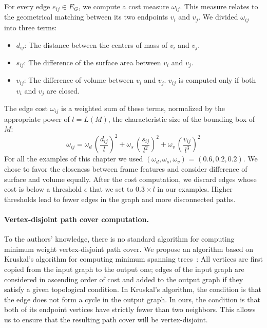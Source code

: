 For every edge $e_{ij}\in E_{G}$, we compute a cost measure \(\omega_{ij}\). This measure relates to the geometrical matching between its two endpoints $v_{i}$ and $v_{j}$.
We divided \(\omega_{ij}\) into three terms:
\begin{itemize}
    \item $d_{ij}$: The distance between the centers of mass of $v_{i}$ and $v_{j}$.
    \item $s_{ij}$: The difference of the surface area between $v_{i}$ and $v_{j}$.
    \item $v_{ij}$: The difference of volume between $v_{i}$ and $v_{j}$. $v_{ij}$ is computed only if both $v_{i}$ and $v_{j}$ are closed.
\end{itemize}
The edge cost $\omega_{ij}$ is a weighted sum of these terms, normalized by the appropriate power of $l=L(M)$, the characteristic size of the bounding box of $M$:
\begin{equation}
\label{eq:costfunction}
\displaystyle \omega_{ij} = 
\omega_{d}\, \left(\frac{d_{ij}}{l  }\right)^2 +
\omega_{s}\, \left(\frac{s_{ij}}{l^2}\right)^2 + 
\omega_{v}\, \left(\frac{v_{ij}}{l^3}\right)^2
\end{equation}
For all the examples of this chapter we used $\left( \omega_{d}, \omega_{s}, \omega_{v} \right)$ = $\left(0.6,0.2,0.2\right)$. We chose to favor the closeness between frame features and consider difference of surface and volume equally. After the cost computation, we discard edges whose cost is below a threshold $\epsilon$ that we set to $0.3 \times l$ in our examples. Higher thresholds lead to fewer edges in the graph and more disconnected paths.

\paragraph*{Vertex-disjoint path cover computation.}

To the authors' knowledge, there is no standard algorithm for computing minimum weight vertex-disjoint path cover. 
We propose an algorithm based on Kruskal's algorithm for computing minimum spanning trees~\cite{kruskal1956shortest}:
All vertices are first copied from the input graph to the output one;
edges of the input graph are considered in ascending order of cost and added to the output graph if they satisfy a given topological condition.
In Kruskal's algorithm, the condition is that the edge does not form a cycle in the output graph.
In ours, the condition is that both of its endpoint vertices have strictly fewer than two neighbors.
This allows us to ensure that the resulting path cover will be vertex-disjoint. 

